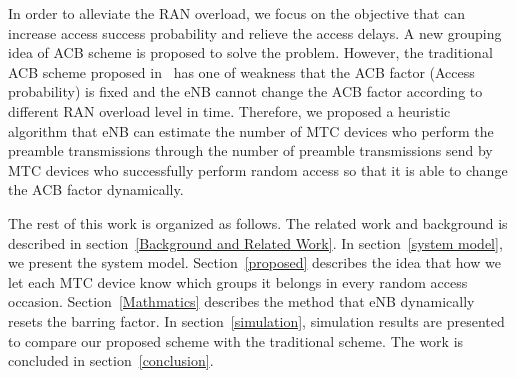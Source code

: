     In order to alleviate the RAN overload, we focus on the objective that can increase access success probability and relieve the access delays. A new grouping idea of ACB scheme is proposed to solve the problem. However, the traditional ACB scheme proposed in~\cite{R2-103742} has one of weakness that the ACB factor (Access probability) is fixed and the eNB cannot change the ACB factor according to different RAN overload level in time. Therefore, we proposed a heuristic algorithm that eNB can estimate the number of MTC devices who perform the preamble transmissions through the number of preamble transmissions send by MTC devices who successfully perform random access so that it is able to change the ACB factor dynamically.


    The rest of this work is organized as follows. The related work and background is described in section~\ref{Background and Related Work}. In section~\ref{system model}, we present the system model. Section~\ref{proposed} describes the idea that how we let each MTC device know which groups it belongs in every random access occasion. Section~\ref{Mathmatics} describes the method that eNB dynamically resets the barring factor. In section~\ref{simulation}, simulation results are presented to compare our proposed scheme with the traditional scheme. The work is concluded in section~\ref{conclusion}.

    